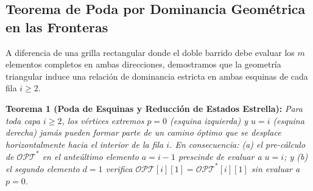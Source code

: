 \subsection{Teorema de Poda por Dominancia Geométrica en las Fronteras}

A diferencia de una grilla rectangular donde el doble barrido debe evaluar los $m$ elementos completos en ambas direcciones, demostramos que la geometría triangular induce una relación de dominancia estricta en ambas esquinas de cada fila $i \geq 2$.

\textbf{Teorema 1 (Poda de Esquinas y Reducción de Estados Estrella):} \textit{Para toda capa $i \geq 2$, los vértices extremos $p = 0$ (esquina izquierda) y $u = i$ (esquina derecha) jamás pueden formar parte de un camino óptimo que se desplace horizontalmente hacia el interior de la fila $i$. En consecuencia: (a) el pre-cálculo de $\mathcal{OPT}^*$ en el anteúltimo elemento $a = i-1$ prescinde de evaluar a $u = i$; y (b) el segundo elemento $d = 1$ verifica $\mathcal{OPT}[i][1] = \mathcal{OPT}^*[i][1]$ sin evaluar a $p = 0$.}

